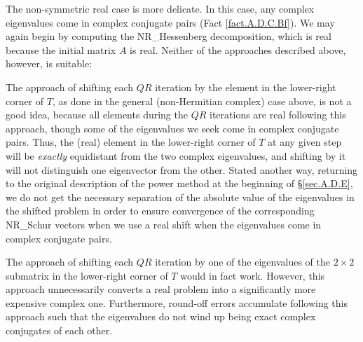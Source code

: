 \begin{figure*}[t]
\end{figure*}


\noindent The non-symmetric real case is more delicate.  In this case, any complex eigenvalues come in complex conjugate pairs (Fact \ref{fact.A.D.C.Bf}).
We may again begin by computing the NR_Hessenberg decomposition, which is real because the initial matrix $A$ is real.  Neither of the approaches described above, however, is suitable:
\beginmylistb
\item The approach of shifting each $QR$ iteration by the element in the lower-right corner of $T$, as done in the general (non-Hermitian complex) case above, is
not a good idea, because all elements during the $QR$ iterations are real following this approach, though some of the eigenvalues we seek come in complex conjugate pairs.
Thus, the (real) element in the lower-right corner of $T$ at any given step
will be {\it exactly} equidistant from the two complex eigenvalues, and shifting by it will not distinguish one eigenvector from the other.  Stated another way,
returning to the original description of the power method at the beginning of \S \ref{sec.A.D.E}, we do not get the necessary separation of the absolute value of the eigenvalues in the shifted problem
in order to ensure convergence of the corresponding NR_Schur vectors when we use a real shift when the eigenvalues come in complex conjugate pairs. 
\item The approach of shifting each $QR$ iteration by one of the eigenvalues of the $2\times 2$ submatrix in the
lower-right corner of $T$ would in fact work.  However, this approach unnecessarily converts a real problem into a significantly more expensive complex one.  Furthermore, round-off errors accumulate following this approach
such that the eigenvalues do not wind up being exact complex conjugates of each other.
\endmylist

